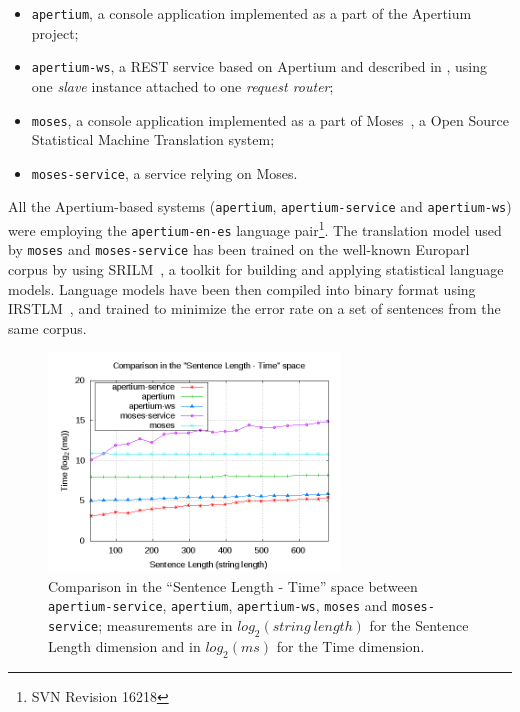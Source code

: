 \documentclass[11pt]{article}
\begin{document}
\begin{itemize}
 \item {\tt\small apertium}, a console application implemented as a part of the Apertium project;
 \item {\tt\small apertium-ws}, a REST service based on Apertium and described in \cite{sanchez-cartagena2009scalable}, using one \emph{slave} instance attached to one \emph{request router};
 \item {\tt\small moses}, a console application implemented as a part of Moses~\citep{moses}, a Open Source Statistical Machine Translation system;
 \item {\tt\small moses-service}, a service relying on Moses.
\end{itemize}

All the Apertium-based systems ({\tt\small apertium}, {\tt\small apertium-service} and {\tt\small apertium-ws}) were employing the {\tt\small apertium-en-es} language pair\footnote{SVN Revision 16218}. The translation model used by {\tt\small moses} and {\tt\small moses-service} has been trained on the well-known Europarl~\citep{europarl} corpus by using SRILM~\citep{srilm}, a toolkit for building and applying statistical language models. Language models have been then compiled into binary format using IRSTLM~\citep{irstlm}, and trained to minimize the error rate on a set of sentences from the same corpus. 

\begin{figure}[!ht]
\begin{center}
\includegraphics[width=7.75cm]{comp}
\end{center}
\caption{Comparison in the ``Sentence Length - Time'' space between {\tt\small apertium-service}, {\tt\small apertium}, {\tt\small apertium-ws}, {\tt\small moses} and {\tt\small moses-service}; measurements are in $log_{2}(string\ length)$ for the Sentence Length dimension and in $log_{2}(ms)$ for the Time dimension.}
\label{fig:comp}
\end{figure}
\end{document}
